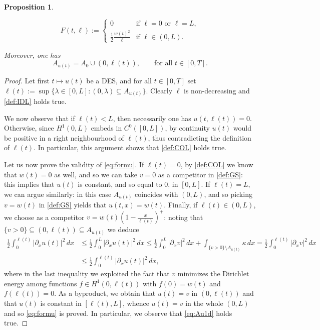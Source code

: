\documentclass[a4paper,11pt,reqno]{amsart}
\numberwithin{equation}{section}
\newtheorem{prop}[teo]{Proposition}
\theoremstyle{definition}
\theoremstyle{remark}
\begin{document}
\begin{prop}
\begin{enumerate}[leftmargin = !, labelwidth=1cm, align = left]
\begin{equation}
            F(t,\ell):=\begin{cases}
                0&\text{if } \ell=0 \text{ or }\ell=L,\\
                \frac 12 \frac{w(t)^2}{\ell} &\text{if } \ell\in (0,L).
            \end{cases}
        \end{equation}
    \end{enumerate}
    Moreover, one has
    \begin{equation}\label{eq:Au1d}
            A_{u(t)}=A_0\cup (0,\ell(t)), \qquad\text{for all }t\in [0,T].
        \end{equation}
    \end{prop}

    \begin{proof}
        Let first $t\mapsto u(t)$ be a DES, and for all $t\in [0,T]$ set $\ell(t):=\sup\{\lambda\in [0,L]: (0,\lambda)\subseteq A_{u(t)}\}$. Clearly $\ell$ is non-decreasing and \ref{def:IDL} holds true.

        We now observe that if $\ell(t)<L$, then necessarily one has $u(t,\ell(t))=0$. Otherwise, since $H^1(0,L)$ embeds in $C^0([0,L])$, by continuity $u(t)$ would be positive in a right neighbourhood of $\ell(t)$, thus contradicting the definition of $\ell(t)$. In particular, this argument shows that \ref{def:COL} holds true.

        Let us now prove the validity of \eqref{eq:formu}. If $\ell(t)=0$, by \ref{def:COL} we know that $w(t)=0$ as well, and so we can take $v=0$ as a competitor in \ref{def:GS}: this implies that $u(t)$ is constant, and so equal to $0$, in $[0,L]$. If $\ell(t)=L$, we can argue similarly: in this case $A_{u(t)}$ coincides with $(0,L)$, and so picking $v=w(t)$ in \ref{def:GS} yields that $u(t,x)=w(t)$. Finally, if $\ell(t)\in (0,L)$, we choose as a competitor $v=w(t)\left(1-\frac{x}{\ell(t)}\right)^+$: noting that $\{v>0\}\subseteq (0,\ell(t))\subseteq A_{u(t)}$ we deduce
        \begin{align}
            \frac 12\int_0^{\ell(t)}|\partial_x u(t)|^2\, dx&\le\frac 12\int_0^{L}|\partial_x u(t)|^2\, dx\le \frac 12\int_0^{L}|\partial_x v|^2\, dx+\int_{\{v>0\}\setminus A_{u(t)}}\kappa \, dx=\frac 12\int_0^{\ell(t)}|\partial_x v|^2\, dx\\
            &\le \frac 12\int_0^{\ell(t)}|\partial_x u(t)|^2\, dx,
        \end{align}
        where in the last inequality we exploited the fact that $v$ minimizes the Dirichlet energy among functions $f\in H^1(0,\ell(t))$ with $f(0)=w(t)$ and $f(\ell(t))=0$. As a byproduct, we obtain that $u(t)=v$ in $(0,\ell(t))$ and that $u(t)$ is constant in $[\ell(t),L]$, whence $u(t)=v$ in the whole $(0,L)$ and so \eqref{eq:formu} is proved. In particular, we observe that \eqref{eq:Au1d} holds true.
        

\end{proof}
\end{document}
